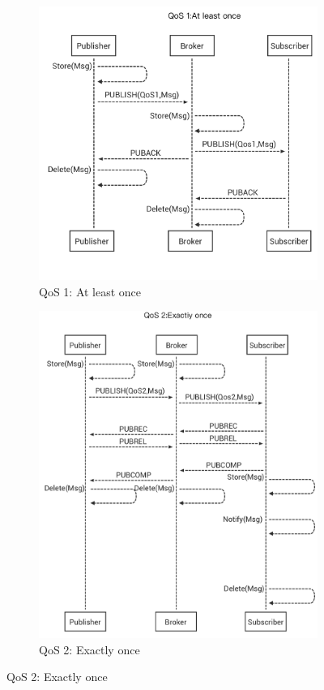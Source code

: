 \documentclass[\main/thesis.tex]{subfiles}
\begin{document}
\begin{figure}[H]
    \centering
    \begin{subfigure}[b]{0.49\linewidth}
        \centering
        \includegraphics[width=1\textwidth]{mqtt_qos_at_least_once.png}
        \caption{QoS 1: At least once}
        \label{fig:mqtt_qos_1}
    \end{subfigure}
    \begin{subfigure}[b]{0.49\linewidth}
        \centering
        \includegraphics[width=1\textwidth]{mqtt_qos_exact_once.png}
        \caption{QoS 2: Exactly once}
        \label{fig:mqtt_qos_2}
    \end{subfigure}
\end{figure}
\end{document}
